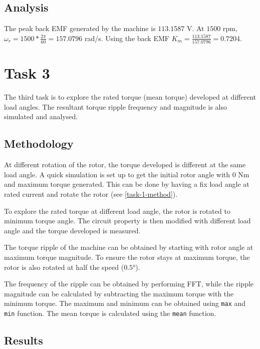 \documentclass[12pt]{article}
\begin{document}
\subsection{Analysis}

The peak back EMF generated by the machine is $113.1587$ V. At $1500$ rpm, $\omega_{r} = 1500 * \frac{2\pi}{60} = 157.0796$ rad/s. Using the back EMF $K_{m} = \frac{113.1587}{157.0796} = 0.7204$.

\section{Task 3}

The third task is to explore the rated torque (mean torque) developed at different load angles. The resultant torque ripple frequency and magnitude is also simulated and analysed.

\subsection{Methodology} \label{task-3-method}

At different rotation of the rotor, the torque developed is different at the same load angle. A quick simulation is set up to get the initial rotor angle with $0$ Nm and maximum torque generated. This can be done by having a fix load angle at rated current and rotate the rotor (see \ref{task-1-method}).

To explore the rated torque at different load angle, the rotor is rotated to minimum torque angle. The circuit property is then modified with different load angle and the torque developed is measured.

The torque ripple of the machine can be obtained by starting with rotor angle at maximum torque magnitude. To ensure the rotor stays at maximum torque, the rotor is also rotated at half the speed ($\ang{0.5}$).

The frequency of the ripple can be obtained by performing FFT, while the ripple magnitude can be calculated by subtracting the maximum torque with the minimum torque. The maximum and minimum can be obtained using \lstinline{max} and \lstinline{min} function. The mean torque is calculated using the \lstinline{mean} function.

\subsection{Results}
\end{document}
